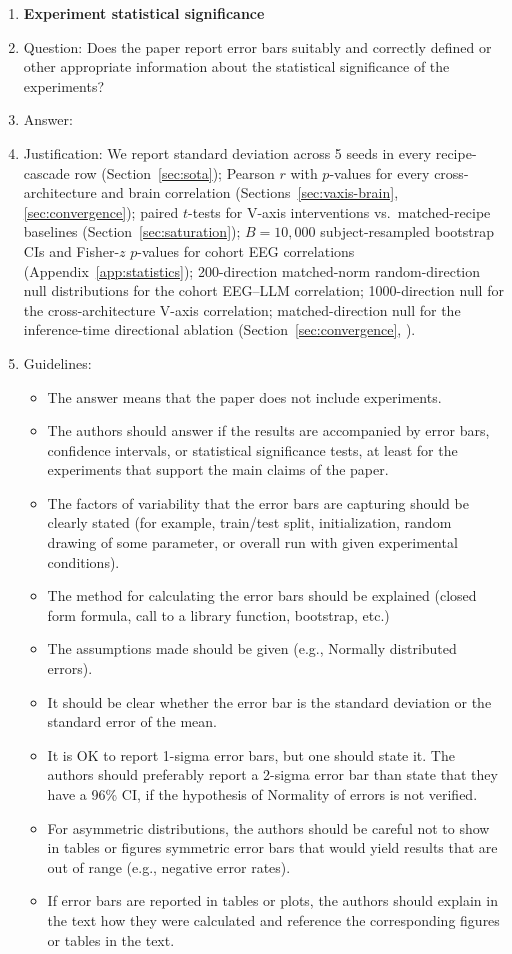 \begin{enumerate}
\item {\bf Experiment statistical significance}
    \item[] Question: Does the paper report error bars suitably and correctly defined or other appropriate information about the statistical significance of the experiments?
    \item[] Answer: \answerYes{}
    \item[] Justification: We report standard deviation across 5 seeds in every recipe-cascade row (Section~\ref{sec:sota}); Pearson $r$ with $p$-values for every cross-architecture and brain correlation (Sections~\ref{sec:vaxis-brain}, \ref{sec:convergence}); paired $t$-tests for V-axis interventions vs.\ matched-recipe baselines (Section~\ref{sec:saturation}); $B=10{,}000$ subject-resampled bootstrap CIs and Fisher-$z$ $p$-values for cohort EEG correlations (Appendix~\ref{app:statistics}); 200-direction matched-norm random-direction null distributions for the cohort EEG--LLM correlation; 1000-direction null for the cross-architecture V-axis correlation; matched-direction null for the inference-time directional ablation (Section~\ref{sec:convergence}, ).
    \item[] Guidelines:
    \begin{itemize}
        \item The answer \answerNA{} means that the paper does not include experiments.
        \item The authors should answer \answerYes{} if the results are accompanied by error bars, confidence intervals, or statistical significance tests, at least for the experiments that support the main claims of the paper.
        \item The factors of variability that the error bars are capturing should be clearly stated (for example, train/test split, initialization, random drawing of some parameter, or overall run with given experimental conditions).
        \item The method for calculating the error bars should be explained (closed form formula, call to a library function, bootstrap, etc.)
        \item The assumptions made should be given (e.g., Normally distributed errors).
        \item It should be clear whether the error bar is the standard deviation or the standard error of the mean.
        \item It is OK to report 1-sigma error bars, but one should state it. The authors should preferably report a 2-sigma error bar than state that they have a 96\% CI, if the hypothesis of Normality of errors is not verified.
        \item For asymmetric distributions, the authors should be careful not to show in tables or figures symmetric error bars that would yield results that are out of range (e.g., negative error rates).
        \item If error bars are reported in tables or plots, the authors should explain in the text how they were calculated and reference the corresponding figures or tables in the text.
    \end{itemize}


\end{enumerate}
